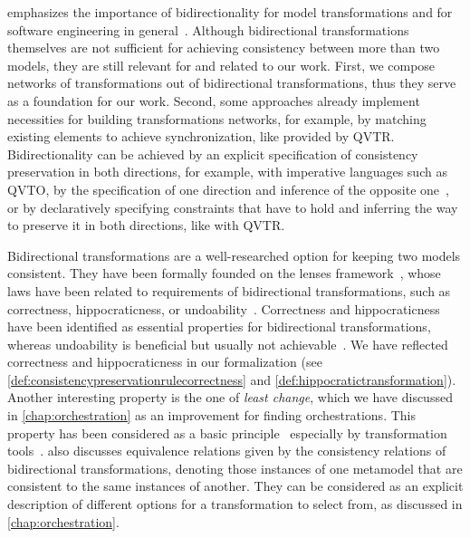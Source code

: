  emphasizes the importance of bidirectionality for model transformations and for software engineering in general~\cite{stevens2018bidirectionality-ECMFA}.
Although bidirectional transformations themselves are not sufficient for achieving consistency between more than two models, they are still relevant for and related to our work.
First, we compose networks of transformations out of bidirectional transformations, thus they serve as a foundation for our work.
Second, some approaches already implement necessities for building transformations networks, for example, by matching existing elements to achieve synchronization, like provided by \gls{QVTR}.
Bidirectionality can be achieved by an explicit specification of consistency preservation in both directions, for example, with imperative languages such as \gls{QVTO}, by the specification of one direction and inference of the opposite one~\cite{xiong2007backwardTransformation-ASE, hettel2008synchronization-ICMT, semerath2016backwardTransformation-MODELS}, or by declaratively specifying constraints that have to hold and inferring the way to preserve it in both directions, like with \gls{QVTR}.

Bidirectional transformations are a well-researched option for keeping two models consistent.
They have been formally founded on the lenses framework~\cite{stevens2008bxalgebraic-ICGT}, whose laws have been related to requirements of bidirectional transformations, such as correctness, hippocraticness, or undoability~\cite{stevens2010sosym}.
Correctness and hippocraticness have been identified as essential properties for bidirectional transformations, whereas undoability is beneficial but usually not achievable~\cite{stevens2010sosym}.
We have reflected correctness and hippocraticness in our formalization (see \autoref{def:consistencypreservationrulecorrectness} and \autoref{def:hippocratictransformation}).
Another interesting property is the one of \emph{least change}, which we have discussed in \autoref{chap:orchestration} as an improvement for finding orchestrations.
This property has been considered as a basic principle~\cite{cheney2017LeastChangeBx-JOT} especially by transformation tools~\cite{macedo2016qvtAtlAlloy-SoSym}.
\textcite{stevens2012equivalences-EASST} also discusses equivalence relations given by the consistency relations of bidirectional transformations, denoting those instances of one metamodel that are consistent to the same instances of another.
They can be considered as an explicit description of different options for a transformation to select from, as discussed in \autoref{chap:orchestration}.


